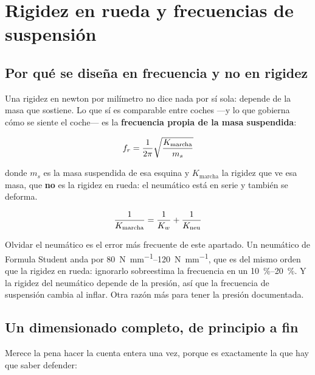 \section{Rigidez en rueda y frecuencias de suspensión}
\label{sec:muelles_amortiguadores:02}

\subsection{Por qué se diseña en frecuencia y no en rigidez}

Una rigidez en newton por milímetro no dice nada por sí sola: depende de la
masa que sostiene. Lo que sí es comparable entre coches ---y lo que gobierna
cómo se siente el coche--- es la \textbf{frecuencia propia de la masa
suspendida}:

\begin{equation}
  f_r = \frac{1}{2\pi}\sqrt{\frac{K_{\text{marcha}}}{m_s}}
  \label{eq:frecuencia_suspension}
\end{equation}

donde $m_s$ es la masa suspendida de esa esquina y $K_{\text{marcha}}$ la
rigidez que ve esa masa, que \textbf{no} es la rigidez en rueda: el neumático
está en serie y también se deforma.

\begin{equation}
  \frac{1}{K_{\text{marcha}}} = \frac{1}{K_w} + \frac{1}{K_{\text{neu}}}
  \label{eq:rigidez_serie}
\end{equation}

\begin{ojo}
Olvidar el neumático es el error más frecuente de este apartado. Un neumático de
Formula Student anda por \SIrange{80}{120}{\newton\per\milli\meter}, que es del
mismo orden que la rigidez en rueda: ignorarlo sobreestima la frecuencia en un
\SIrange{10}{20}{\percent}. Y la rigidez del neumático depende de la presión,
así que la frecuencia de suspensión cambia al inflar. Otra razón más para tener
la presión documentada.
\end{ojo}

\subsection{Un dimensionado completo, de principio a fin}

Merece la pena hacer la cuenta entera una vez, porque es exactamente la que hay
que saber defender:

